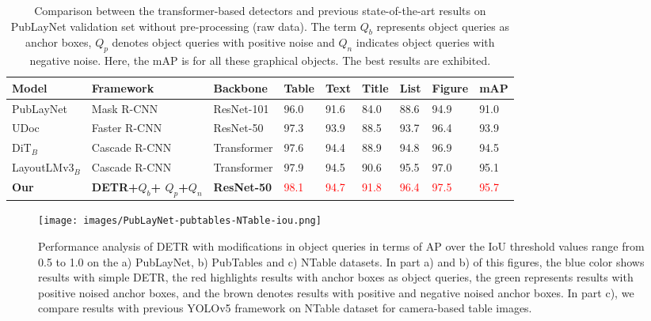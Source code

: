 \documentclass[sn-mathphys]{sn-jnl}\jyear{2021}\theoremstyle{thmstyleone}\newtheorem{theorem}{Theorem}\newtheorem{proposition}[theorem]{Proposition}\theoremstyle{thmstyletwo}\newtheorem{example}{Example}\newtheorem{remark}{Remark}\theoremstyle{thmstylethree}\newtheorem{definition}{Definition}\usepackage{amsmath}
\begin{document}
\begin{table*}
\tiny
\begin{center}
\caption{Comparison between the transformer-based detectors and previous state-of-the-art results on PubLayNet validation set \colorbox{red!25}{without pre-processing} (raw data). The term $Q_b$ represents object queries as anchor boxes, $Q_p$ denotes object queries with positive noise and $Q_n$ indicates object queries with negative noise. Here, the mAP is for all these graphical objects. The best results are exhibited.}\label{tab:PubLayNet2}\begin{tabular*}{\textwidth}
{@{\extracolsep{\fill}}lp{1.7cm}lllllll@{\extracolsep{\fill}}}
\toprule
\textbf{Model} &
\textbf{Framework} &
\textbf{Backbone} &
\textbf{Table} &
\textbf{Text} &
\textbf{Title} &
\textbf{List} &
\textbf{Figure} &
\textbf{mAP} \\
\midrule
PubLayNet \cite{PubLayNet3} &
Mask R-CNN  &
ResNet-101 &
96.0 & 91.6 & 84.0 & 88.6 & 94.9 & 91.0 \\ \midrule

UDoc \cite{UDoc39} &
Faster R-CNN &
ResNet-50 &
97.3 & 93.9 & 88.5 & 93.7 & 96.4 & 93.9 \\ \midrule

DiT$_{B}$ \cite{Lidit78} & 
Cascade R-CNN &
Transformer &
97.6 & 94.4 & 88.9 & 94.8 & 96.9 & 94.5\\ \midrule

LayoutLMv3$_{B}$ \cite{layoutMV3} &
Cascade R-CNN &
 Transformer &
97.9 & 94.5 & 90.6 & 95.5 & 97.0 & 95.1 \\ \midrule

\textbf{Our } &
\textbf{DETR+$Q_b$+$ $ $Q_p$+$Q_n$} &
\textbf{ResNet-50} &
\textcolor{red}{98.1} &
\textcolor{red}{94.7} &
\textcolor{red}{91.8} &
\textcolor{red}{96.4} &
\textcolor{red}{97.5} &
\textcolor{red}{95.7} \\
\bottomrule
\end{tabular*}
\end{center}
\end{table*}


\begin{figure}[h!]
\centering
\texttt{[image: images/PubLayNet-pubtables-NTable-iou.png]}
\caption{Performance analysis of DETR with modifications in object queries in terms of AP over the IoU threshold values range from 0.5 to 1.0 on the a) PubLayNet, b) PubTables and c) NTable datasets. In part a) and b) of this figures, the blue color shows results with simple DETR, the red highlights results with anchor boxes as object queries, the green represents results with positive noised anchor boxes, and the brown denotes results with positive and negative noised anchor boxes. In part c), we compare results with previous YOLOv5 framework on NTable dataset for camera-based table images.}\label{fig:PubLayNet-pubtables-iou}
\end{figure}
\end{document}
